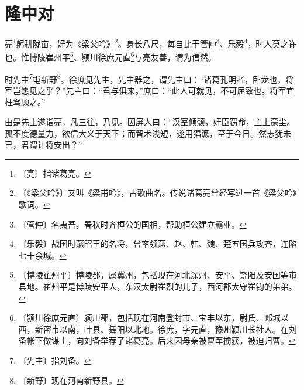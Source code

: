 \documentclass[12pt,UTF-8,openany,a4]{ctexbook}
\begin{document}
\chapter{隆中对}

\begin{large}
    
    亮\footnote{〔亮〕\yiwen 指诸葛亮。}躬耕陇亩，好为《梁父吟》\footnote{〔《梁父吟》〕\yiwen 又叫《梁甫吟》，古歌曲名。传说诸葛亮曾经写过一首《梁父吟》歌词。}。身长八尺，每自比于管仲\footnote{〔管仲〕\yiwen 名夷吾，春秋时齐桓公的国相，帮助桓公建立霸业。}、乐毅\footnote{〔乐毅〕\yiwen 战国时燕昭王的名将，曾率领燕、赵、韩、魏、楚五国兵攻齐，连陷七十余城。}，时人莫之许也。惟博陵崔州平\footnote{〔博陵崔州平〕\yiwen 博陵郡，属冀州，包括现在河北深州、安平、饶阳及安国等市县地。崔州平是博陵安平人，东汉太尉崔烈的儿子，西河郡太守崔钧的弟弟。}、颍川徐庶元直\footnote{〔颍川徐庶元直〕\yiwen 颍川郡，包括现在河南登封市、宝丰以东，尉氏、郾城以西，新密市以南，叶县、舞阳以北地。徐庶，字元直，豫州颍川长社人。在刘备帐下做谋士，向刘备举荐了诸葛亮。后来因母亲被曹军掳获，被迫归曹。}与亮友善，谓为信然。
    
    时先主\footnote{〔先主〕\yiwen 指刘备。}屯新野\footnote{〔新野〕\yiwen 现在河南新野县。}。徐庶见先主，先主器之，谓先主曰：“诸葛孔明者，卧龙也，将军岂愿见之乎？”先主曰：“君与俱来。”庶曰：“此人可就见，不可屈致也。将军宜枉驾顾之。”
    
    由是先主遂诣亮，凡三往，乃见。因屏人曰：“汉室倾颓，奸臣窃命，主上蒙尘。孤不度德量力，欲信大义于天下；而智术浅短，遂用猖蹶，至于今日。然志犹未已，君谓计将安出？”
    

\end{large}
\end{document}
